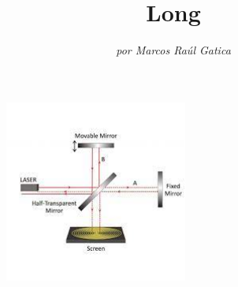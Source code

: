 \documentclass[a4paper]{beamer}
\title{\vspace{-0.8cm}Long}
\author{\vspace{0.2cm}\textit{por Marcos Raúl Gatica}}
\date{}
\begin{document}
	\begin{frame}[plain]
    	\maketitle
    	\vspace{-2cm}
    	\begin{figure}[h!]
    		\centering
    		\includegraphics[width=6cm]{../imagenes/interferometro2.jpg}
    	\end{figure}
	\end{frame}
	
\end{document}
